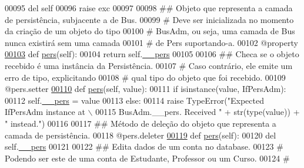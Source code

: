 \begin{DoxyCode}
00095             del self
00096             \textcolor{keywordflow}{raise} exc
00097     
00098     \textcolor{comment}{## Objeto que representa a camada de persistência, subjacente a de Bus.}
00099     \textcolor{comment}{#   Deve ser inicializada no momento da criação de um objeto do tipo}
00100     \textcolor{comment}{#   BusAdm, ou seja, uma camada de Bus nunca existirá sem uma camada}
00101     \textcolor{comment}{#   de Pers suportando-a.}
00102     @property
\hypertarget{AdmUnit_8py_source_l00103}{}\hyperlink{classAdm_1_1AdmUnit_1_1IfBusAdm_a58f07186cfb366e305adbbd4f7fd2b72}{00103}     \textcolor{keyword}{def }\hyperlink{classAdm_1_1AdmUnit_1_1IfBusAdm_a95ea8f39fbbcddf44822e1614c712bfe}{pers}(self):
00104         \textcolor{keywordflow}{return} self.\hyperlink{classAdm_1_1AdmUnit_1_1IfBusAdm_a52e9179e1047122bc667c1afa377c82c}{\_\_pers}
00105 
00106     \textcolor{comment}{## Checa se o objeto recebido é uma instância da Persistência.}
00107     \textcolor{comment}{#   Caso contrário, ele emite um erro de tipo, explicitando}
00108     \textcolor{comment}{#   qual tipo do objeto que foi recebido.}
00109     @pers.setter
\hypertarget{AdmUnit_8py_source_l00110}{}\hyperlink{classAdm_1_1AdmUnit_1_1IfBusAdm_a0022f3706dcdb0d5c2795daafc2478df}{00110}     \textcolor{keyword}{def }\hyperlink{classAdm_1_1AdmUnit_1_1IfBusAdm_a95ea8f39fbbcddf44822e1614c712bfe}{pers}(self, value):
00111         \textcolor{keywordflow}{if} isinstance(value, IfPersAdm):
00112             self.\hyperlink{classAdm_1_1AdmUnit_1_1IfBusAdm_a52e9179e1047122bc667c1afa377c82c}{\_\_pers} = value
00113         \textcolor{keywordflow}{else}:
00114             \textcolor{keywordflow}{raise} TypeError(\textcolor{stringliteral}{"Expected IfPersAdm instance at \(\backslash\)}
00115 \textcolor{stringliteral}{                BusAdm.\_\_pers. Received "} + str(type(value)) + \textcolor{stringliteral}{" instead."})
00116 
00117     \textcolor{comment}{## Método de deleção do objeto que representa a camada de persistência.}
00118     @pers.deleter   
\hypertarget{AdmUnit_8py_source_l00119}{}\hyperlink{classAdm_1_1AdmUnit_1_1IfBusAdm_a58f07186cfb366e305adbbd4f7fd2b72}{00119}     \textcolor{keyword}{def }\hyperlink{classAdm_1_1AdmUnit_1_1IfBusAdm_a95ea8f39fbbcddf44822e1614c712bfe}{pers}(self):
00120         del self.\hyperlink{classAdm_1_1AdmUnit_1_1IfBusAdm_a52e9179e1047122bc667c1afa377c82c}{\_\_pers}
00121 
00122     \textcolor{comment}{## Edita dados de um conta no database.}
00123     \textcolor{comment}{#   Podendo ser este de uma conta de Estudante, Professor ou um Curso.}
00124     \textcolor{comment}{#}

\end{DoxyCode}
